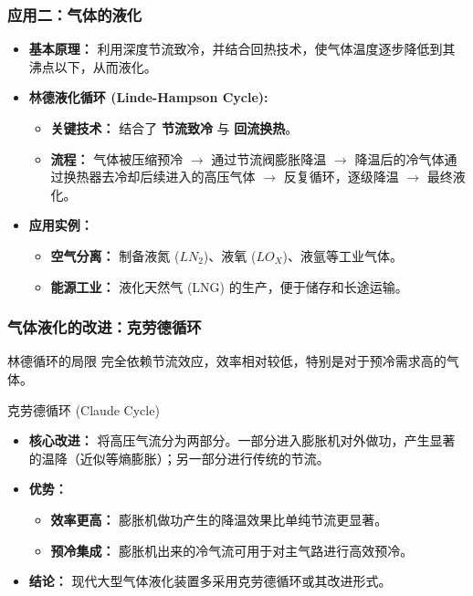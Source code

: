\documentclass{beamer}
\begin{document}
\begin{frame}
  \frametitle{应用二：气体的液化}
    \begin{itemize}
    \item \textbf{基本原理：} 利用深度节流致冷，并结合\alert{回热}技术，使气体温度逐步降低到其沸点以下，从而液化。
    \vfill
    \item \textbf{林德液化循环 (Linde-Hampson Cycle):}
    \begin{itemize}
      \item \textbf{关键技术：} 结合了 \textbf{\alert{节流致冷}} 与 \textbf{\alert{回流换热}}。
      \item \textbf{流程：} 气体被压缩预冷 $\rightarrow$ 通过节流阀膨胀降温 $\rightarrow$ \alert{降温后的冷气体通过换热器去冷却后续进入的高压气体} $\rightarrow$ 反复循环，逐级降温 $\rightarrow$ 最终液化。
    \end{itemize}
    \vfill
    \item \textbf{应用实例：}
    \begin{itemize}
        \item \textbf{空气分离：} 制备液氮 ($LN_2$)、液氧 ($LO_X$)、液氩等工业气体。
        \item \textbf{能源工业：} 液化天然气 (LNG) 的生产，便于储存和长途运输。
    \end{itemize}
  \end{itemize}
\end{frame}

\begin{frame}
    \frametitle{气体液化的改进：克劳德循环}
    \begin{block}{林德循环的局限}
        完全依赖节流效应，效率相对较低，特别是对于预冷需求高的气体。
    \end{block}
    \vfill
    \begin{block}{克劳德循环 (Claude Cycle)}
        \begin{itemize}
            \item \textbf{核心改进：} 将高压气流分为两部分。一部分进入\alert{膨胀机}对外做功，产生显著的温降（近似等熵膨胀）；另一部分进行传统的节流。
            \item \textbf{优势：}
            \begin{itemize}
                \item \textbf{效率更高：} 膨胀机做功产生的降温效果比单纯节流更显著。
                \item \textbf{预冷集成：} 膨胀机出来的冷气流可用于对主气路进行高效预冷。
            \end{itemize}
            \item \textbf{结论：} 现代大型气体液化装置多采用克劳德循环或其改进形式。
        \end{itemize}
    \end{block}
\end{frame}
\end{document}
